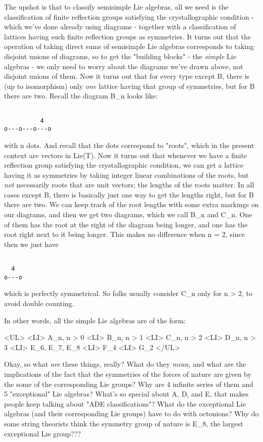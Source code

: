 The upshot is that to classify semisimple Lie algebras, all we need is
the classification of finite reflection groups satisfying the
crystallographic condition - which we've done already using diagrams
- together with a classification of lattices having such finite
reflection groups as symmetries.  It turns out that the operation of
taking direct sums of semisimple Lie algebras corresponds to taking
disjoint unions of diagrams, so to get the "building blocks" - the
\emph{simple} Lie algebras - we only need to worry about the diagrams we've
drawn above, not disjoint unions of them.  Now it turns out that for
every type except B, there is (up to isomorphism) only \emph{one} lattice
having that group of symmetries, but for B there are two.  Recall the
diagram B_{n} looks like:


\begin{verbatim}

          4
o---o---o---o
\end{verbatim}
    

with n dots.  And recall that the dots correspond to
"roots", which in the present context are vectors in Lie(T).
Now it turns out that whenever we have a finite reflection group
satisfying the crystallographic condition, we can get a lattice having
it as symmetries by taking integer linear combinations of the roots,
but \emph{not} necessarily roots that are unit vectors; the lengths
of the roots matter.  In all cases except B, there is basically just
one way to get the lengths right, but for B there are two.  We can
keep track of the root lengths with some extra markings on our
diagrams, and then we get two diagrams, which we call B_{n}
and C_{n}.  One of them has the root at the right of the
diagram being longer, and one has the root right next to it being
longer.  This makes no difference when n = 2, since then we just have


\begin{verbatim}

  4
o---o
\end{verbatim}
    

which is perfectly symmetrical.  So folks usually consider C_{n}
only for n > 2, to avoid double counting.  

In other words, all the simple Lie algebras are of the form:

<UL>
<LI>
A_{n}, n > 0
<LI>
B_{n}, n > 1
<LI>
C_{n}, n > 2
<LI>
D_{n}, n > 3
<LI>
E_{6}, E_{7}, E_{8}
<LI>
F_{4}
<LI>
G_{2}
</UL>

Okay, so what \emph{are} these things, really?  What do they
\emph{mean}, and what are the implications of the fact that the
symmetries of the forces of nature are given by the some of the
corresponding Lie groups?  Why are 4 infinite series of them and 5
"exceptional" Lie algebras?  What's so special about A, D,
and E, that makes people keep talking about "ADE
classifications"?  What do the exceptional Lie algebras (and
their corresponding Lie groups) have to do with octonions?  Why do
some string theorists think the symmetry group of nature is
E_{8}, the largest exceptional Lie group???

